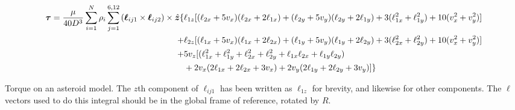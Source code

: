 \documentclass[aps,twocolumn,secnumarabic,balancelastpage,amsmath,amssymb,nofootinbib,floatfix]{revtex4-1}
\begin{document}
\begin{table*}
    \begin{equation}
        \begin{aligned}
        \bm \tau = \frac{\mu}{40D^3}\sum_{i=1}^N\rho_i \sum_{j=1}^{6, 12} \left( \bm\ell_{ij1} \times \bm\ell_{ij2} \right) \times \hat {\bm z} \{
        &\ell_{1z} [(\ell_{2x} + 5v_x)(\ell_{2x} + 2\ell_{1x}) + (\ell_{2y} + 5 v_y)(\ell_{2y}+2\ell_{1y}) + 3 (\ell_{1x}^2 + \ell_{1y}^2) + 10(v_x^2 + v_y^2)]\\
        + &\ell_{2z} [ (\ell_{1x}+5v_x)(\ell_{1x}+2\ell_{2x}) + (\ell_{1y}+5v_y)(\ell_{1y}+2\ell_{2y}) + 3 (\ell_{2x}^2 + \ell_{2y}^2) + 10(v_x^2 + v_y^2)]\\
        + &5v_z [(\ell_{1x}^2 + \ell_{1y}^2 + \ell_{2x}^2 + \ell_{2y}^2 + \ell_{1x} \ell_{2x} + \ell_{1y} \ell_{2y}) \\
        & + 2v_x(2\ell_{1x} + 2\ell_{2x} + 3 v_x) + 2v_y(2\ell_{1y} + 2\ell_{2y} + 3 v_y)]\}
        \end{aligned}
    \label{eqn:analytical-torque}
    \end{equation}
    \caption*{Torque on an asteroid model. The $z$th component of $\bm \ell_{ij1}$ has been written as $\ell_{1z}$ for brevity, and likewise for other components. The $\bm \ell$ vectors used to do this integral should be in the global frame of reference, rotated by $R$.}
\end{table*}




\end{document}
